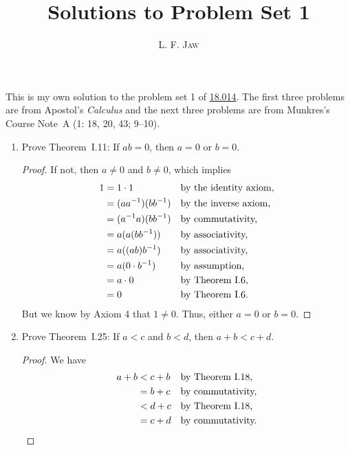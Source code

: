 \documentclass[a4paper]{article}
\title{Solutions to Problem Set 1}
\author{L. F. \textsc{Jaw}}
\begin{document}
\maketitle

This is my own solution to the problem set 1 of
\href{https://ocw.mit.edu/courses/mathematics/18-014-calculus-with-theory-fall-2010/assignments/}{18.014}.
The first three problems are from Apostol's \textit{Calculus} and the next
three problems are from Munkres's Course Note~A (1: 18, 20, 43; 9--10).

\begin{enumerate}
\item Prove Theorem~I.11: If \(ab=0\), then \(a=0\) or \(b=0\).

  \begin{proof}
    If not, then \(a \ne 0\) and \(b \ne 0\), which implies
    \begin{align*}
      1 &= 1 \cdot 1           && \text{by the identity axiom,} \\
        &= (aa^{-1}) (bb^{-1}) && \text{by the inverse axiom,} \\
        &= (a^{-1}a) (bb^{-1}) && \text{by commutativity,} \\
        &= a (a(bb^{-1}))      && \text{by associativity,} \\
        &= a ((ab)b^{-1})      && \text{by associativity,} \\
        &= a (0 \cdot b^{-1})  && \text{by assumption,} \\
        &= a \cdot 0           && \text{by Theorem~I.6,} \\
        &= 0                   && \text{by Theorem~I.6.}
    \end{align*}
    But we know by Axiom 4 that \(1 \ne 0\).  Thus, either \(a = 0\) or
    \(b = 0\).
  \end{proof}

\item Prove Theorem~I.25: If \(a < c\) and \(b < d\), then \(a+b < c+d\).

  \begin{proof}
    We have
    \begin{align*}
      a + b &< c + b && \text{by Theorem~I.18,} \\
            &= b + c && \text{by commutativity,} \\
            &< d + c && \text{by Theorem~I.18,} \\
            &= c + d && \text{by commutativity.} \qedhere
    \end{align*}
  \end{proof}


\end{enumerate}
\end{document}
